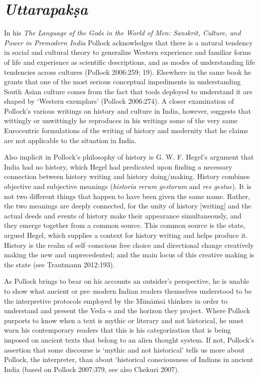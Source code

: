 \section*{\textit{Uttarapakṣa}}

In his \textit{The Language of the Gods in the World of Men: Sanskrit, Culture, and Power in Premodern India} Pollock acknowledges that there is a natural tendency in social and cultural theory to generalize Western experience and familiar forms of life and experience as scientific descriptions, and as modes of understanding life tendencies across cultures (Pollock 2006:259; 19). Elsewhere in the same book he grants that one of the most serious conceptual impediments in understanding South Asian culture comes from the fact that tools deployed to understand it are shaped by ‘Western exemplars’ (Pollock 2006:274). A closer examination of Pollock’s various writings on history and culture in India, however, suggests that wittingly or unwittingly he reproduces in his writings some of the very same Eurocentric formulations of the writing of history and modernity that he claims are not applicable to the situation in India.

Also implicit in Pollock’s philosophy of history is G. W. F. Hegel’s argument that India had no history, which Hegel had predicated upon finding a necessary connection between history writing and history doing/making. History combines objective and subjective meanings (\textit{historia rerum gestorum} and \textit{res gestae}). It is not two different things that happen to have been given the same name. Rather, the two meanings are deeply connected, for the unity of history [writing] and the actual deeds and events of history make their appearance simultaneously, and they emerge together from a common source. This common source is the state, argued Hegel, which supplies a context for history writing and helps produce it. History is the realm of self–conscious free choice and directional change creatively making the new and unprecedented; and the main locus of this creative making is the state (see Trautmann 2012:193).

As Pollock brings to bear on his accounts an outsider’s perspective, he is unable to show what ancient or pre–modern Indian readers themselves understood to be the interpretive protocols employed by the Mīmāṁsā thinkers in order to understand and present the Veda–s and the horizon they project. Where Pollock purports to know when a text is mythic or literary and not historical, he must warn his contemporary readers that this is his categorization that is being imposed on ancient texts that belong to an alien thought system. If not, Pollock’s assertion that some discourse is ‘mythic and not historical’ tells us more about Pollock, the interpreter, than about ‘historical consciousness of Indians in ancient India (based on Pollock 2007:379, see also Chekuri 2007).

